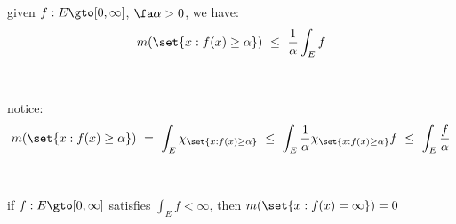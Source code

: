 \begin{thm}[title=Markov's Inequality]
	given $f:E\gto[0,\infty]$, $\fa\alpha>0$, we have:
	\begin{equation*}
		m(\set{x:f(x)\geq\alpha}) \ \leq \ \frac{1}{\alpha}\int_{E}f
	\end{equation*}
\end{thm} \

\begin{pf}
	notice:
	\begin{equation*}
		m(\set{x:f(x)\geq\alpha}) \ = \ \int_{E}\chi_{\set{x:f(x)\geq\alpha}}
		\ \leq \ \int_{E}\frac{1}{\alpha}\chi_{\set{x:f(x)\geq\alpha}}f
		\ \leq \ \int_{E}\frac{f}{\alpha}
	\end{equation*}
\end{pf} \

\begin{crll}
	if $f:E\gto[0,\infty]$ satisfies $\int_{E}f<\infty$, then
	$m(\set{x:f(x)=\infty})=0$
\end{crll}
